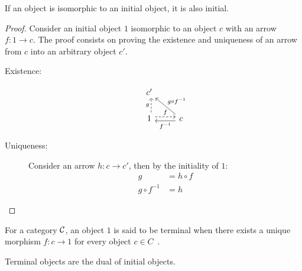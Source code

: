 \begin{theorem}
  If an object is isomorphic to an initial object, it is also initial.

  \begin{proof}
    Consider an initial object $1$ isomorphic to an object $c$ with an arrow
    $f:1\to c$. The proof consists on proving the existence and uniqueness of an
    arrow from $c$ into an arbitrary object $c'$.

    \begin{description}
      \item[Existence:]
        \[\begin{tikzcd}[ampersand replacement=\&]
          {c'} \\
          1 \& c
          \arrow["f", shift left=1, dashed, from=2-1, to=2-2]
          \arrow["{f^{-1}}", shift left=1, from=2-2, to=2-1]
          \arrow["g", shift right=1, dashed, from=2-1, to=1-1]
          \arrow["{g\circ f^{-1}}"', from=2-2, to=1-1]
        \end{tikzcd}\]
      \item[Uniqueness:] Consider an arrow $h:c\to c'$, then by the initiality
        of $1$:
        \[
          \begin{aligned}
            g &= h\circ f\\
            g\circ f^{-1} &= h
          \end{aligned}
        \]
    \end{description}
  \end{proof}
\end{theorem}

\begin{definition}
  For a category $\mathcal{C}$, an object $1$ is said to be terminal when there exists a
  unique morphism $f: c\to 1$ for every object $c\in
  C$~\parencite{awodey:category_theory}.
\end{definition}

\begin{remark}
  Terminal objects are the dual of initial objects.
\end{remark}

